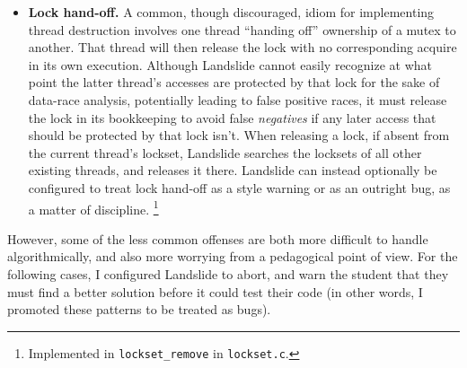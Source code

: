 \begin{itemize}
		When a deadlock arises under conditions where one or more threads are heuristically blocked,
		Landslide attempts to refute it as a false positive by artificially unblocking all heuristically-blocked threads.
		\footnote{If any threads are ICB-blocked, I prioritize waking those before trying to wake any yield-blocked threads.
		Waking all threads at once here can lead to unsoundness.}
		Landslide then repeats this process a heuristic constant number of times (128),
		allowing the program that many chances to make progress before proclaiming deadlock.
		\footnote{Implemented in {\tt try\_avoid\_fp\_deadlock} in {\tt arbiter.c}.}
		Note that this heuristic cannot miss true deadlocks as false negatives:
		if the deadlock is true, each thread will immediately trigger the yield-blocking heuristic again,
		bringing the system back into deadlocked state as many times as necessary to exhaust the heuristic limit.
	\item {\bf Lock hand-off.}
		A common, though discouraged, idiom for implementing thread destruction involves one thread ``handing off'' ownership of a mutex to another.
		That thread will then release the lock with no corresponding acquire in its own execution.
		Although Landslide cannot easily recognize at what point the latter thread's accesses are protected by that lock for the sake of data-race analysis,
		potentially leading to false positive races,
		it must release the lock in its bookkeeping to avoid false {\em negatives} if any later access that should be protected by that lock isn't.
		When releasing a lock, if absent from the current thread's lockset, Landslide searches the locksets of all other existing threads, and releases it there.
		Landslide can instead optionally be configured to treat lock hand-off as a style warning or as an outright bug, as a matter of discipline.
		\footnote{Implemented in {\tt lockset\_remove} in {\tt lockset.c}.}

\end{itemize}

However, some of the less common offenses are both more difficult to handle algorithmically, and also more worrying from a pedagogical point of view.
For the following cases, I configured Landslide to abort, and warn the student that they must find a better solution before it could test their code (in other words, I promoted these patterns to be treated as bugs).

